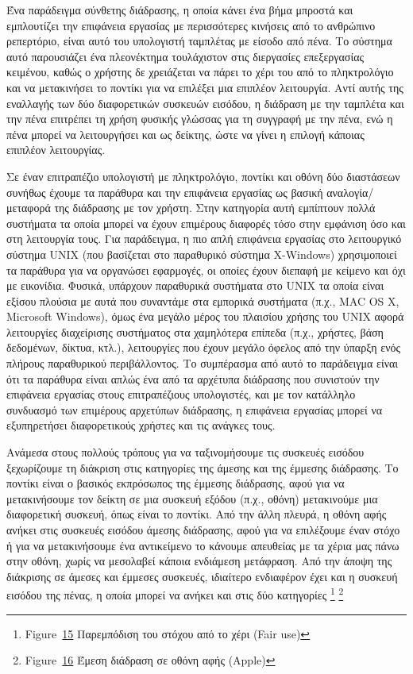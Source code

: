 \documentclass[
]{article}
\begin{document}
Ένα παράδειγμα σύνθετης διάδρασης, η οποία κάνει ένα βήμα μπροστά και
εμπλουτίζει την επιφάνεια εργασίας με περισσότερες κινήσεις από το
ανθρώπινο ρεπερτόριο, είναι αυτό του υπολογιστή ταμπλέτας με είσοδο από
πένα. Το σύστημα αυτό παρουσιάζει ένα πλεονέκτημα τουλάχιστον στις
διεργασίες επεξεργασίας κειμένου, καθώς ο χρήστης δε χρειάζεται να πάρει
το χέρι του από το πληκτρολόγιο και να μετακινήσει το ποντίκι για να
επιλέξει μια επιπλέον λειτουργία. Αντί αυτής της εναλλαγής των δύο
διαφορετικών συσκευών εισόδου, η διάδραση με την ταμπλέτα και την πένα
επιτρέπει τη χρήση φυσικής γλώσσας για τη συγγραφή με την πένα, ενώ η
πένα μπορεί να λειτουργήσει και ως δείκτης, ώστε να γίνει η επιλογή
κάποιας επιπλέον λειτουργίας.

Σε έναν επιτραπέζιο υπολογιστή με πληκτρολόγιο, ποντίκι και οθόνη δύο
διαστάσεων συνήθως έχουμε τα παράθυρα και την επιφάνεια εργασίας ως
βασική αναλογία/μεταφορά της διάδρασης με τον χρήστη. Στην κατηγορία
αυτή εμπίπτουν πολλά συστήματα τα οποία μπορεί να έχουν επιμέρους
διαφορές τόσο στην εμφάνιση όσο και στη λειτουργία τους. Για παράδειγμα,
η πιο απλή επιφάνεια εργασίας στο λειτουργικό σύστημα UNIX (που
βασίζεται στο παραθυρικό σύστημα X-Windows) χρησιμοποιεί τα παράθυρα για
να οργανώσει εφαρμογές, οι οποίες έχουν διεπαφή με κείμενο και όχι με
εικονίδια. Φυσικά, υπάρχουν παραθυρικά συστήματα στο UNIX τα οποία είναι
εξίσου πλούσια με αυτά που συναντάμε στα εμπορικά συστήματα (π.χ., MAC
OS X, Microsoft Windows), όμως ένα μεγάλο μέρος του πλαισίου χρήσης του
UNIX αφορά λειτουργίες διαχείρισης συστήματος στα χαμηλότερα επίπεδα
(π.χ., χρήστες, βάση δεδομένων, δίκτυα, κτλ.), λειτουργίες που έχουν
μεγάλο όφελος από την ύπαρξη ενός πλήρους παραθυρικού περιβάλλοντος. Το
συμπέρασμα από αυτό το παράδειγμα είναι ότι τα παράθυρα είναι απλώς ένα
από τα αρχέτυπα διάδρασης που συνιστούν την επιφάνεια εργασίας στους
επιτραπέζιους υπολογιστές, και με τον κατάλληλο συνδυασμό των επιμέρους
αρχετύπων διάδρασης, η επιφάνεια εργασίας μπορεί να εξυπηρετήσει
διαφορετικούς χρήστες και τις ανάγκες τους.

Ανάμεσα στους πολλούς τρόπους για να ταξινομήσουμε τις συσκευές εισόδου
ξεχωρίζουμε τη διάκριση στις κατηγορίες της άμεσης και της έμμεσης
διάδρασης. Το ποντίκι είναι ο βασικός εκπρόσωπος της έμμεσης διάδρασης,
αφού για να μετακινήσουμε τον δείκτη σε μια συσκευή εξόδου (π.χ., οθόνη)
μετακινούμε μια διαφορετική συσκευή, όπως είναι το ποντίκι. Από την άλλη
πλευρά, η οθόνη αφής ανήκει στις συσκευές εισόδου άμεσης διάδρασης, αφού
για να επιλέξουμε έναν στόχο ή για να μετακινήσουμε ένα αντικείμενο το
κάνουμε απευθείας με τα χέρια μας πάνω στην οθόνη, χωρίς να μεσολαβεί
κάποια ενδιάμεση μετάφραση. Από την άποψη της διάκρισης σε άμεσες και
έμμεσες συσκευές, ιδιαίτερο ενδιαφέρον έχει και η συσκευή εισόδου της
πένας, η οποία μπορεί να ανήκει και στις δύο κατηγορίες \footnote{Figure~\protect\hyperlink{fig:hand-occlusion}{15}
  Παρεμπόδιση του στόχου από το χέρι (Fair use)} \footnote{Figure~\protect\hyperlink{fig:media-scrub}{16}
  Έμεση διάδραση σε οθόνη αφής (Apple)}
\end{document}
